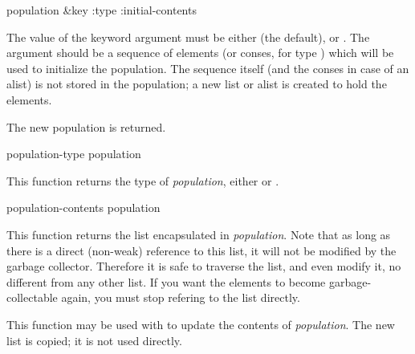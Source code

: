 \begin{defun}[Function]
population &key :type :initial-contents

The value of the  keyword argument must be either 
(the default), or .  The  argument
should be a sequence of elements (or conses, for type )
which will be used to initialize the population.  The sequence itself
(and the conses in case of an alist) is not stored in the population;
a new list or alist is created to hold the elements.

The new population is returned.
\end{defun}

\begin{defun}[Function]
population-type population

This function returns the type of {\it population}, either
 or .
\end{defun}

\begin{defun}[Function]
population-contents population

This function returns the list encapsulated in {\it population}. Note that
as long as there is a direct (non-weak) reference to this list, it
will not be modified by the garbage collector. Therefore it is safe to
traverse the list, and even modify it, no different from any other
list. If you want the elements to become garbage-collectable again,
you must stop refering to the list directly.

This function may be used with  to update the contents of
{\it population}.  The new list is copied;  it is not used directly.
\end{defun}




